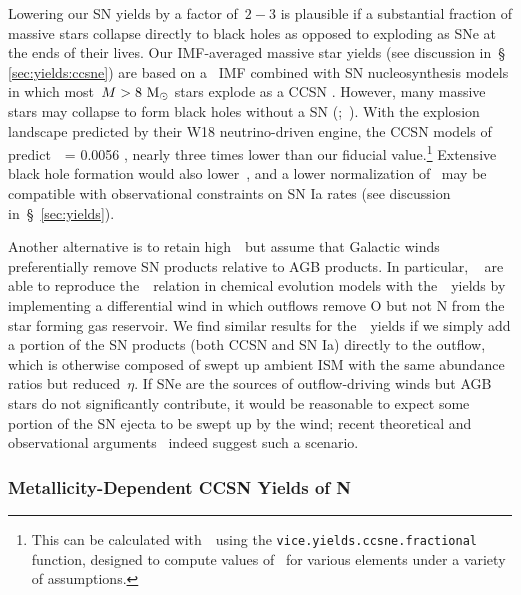 \documentclass[ms.tex]{subfiles}
\begin{document}
\par
Lowering our SN yields by a factor of~$2 - 3$ is plausible if a substantial
fraction of massive stars collapse directly to black holes as opposed to
exploding as SNe at the ends of their lives.
Our IMF-averaged massive star yields (see discussion in~\S
\ref{sec:yields:ccsne}) are based on a~\citet{Kroupa2001} IMF combined with SN
nucleosynthesis models in which most~$M > 8~\text{M}_\odot$ stars explode as a CCSN
\cite[e.g.][]{Woosley1995, Chieffi2004, Chieffi2013, Limongi2018, Nomoto2013}.
However, many massive stars may collapse to form black holes without a SN
(\citealp*{Pejcha2015, Gerke2015};~\citealp{Sukhbold2016, Ertl2016, Adams2017,
Basinger2021, Neustadt2021}).
With the explosion landscape predicted by their W18 neutrino-driven engine, the
CCSN models of~\citet{Sukhbold2016} predict~~= 0.0056
\citep{Griffith2021}, nearly three times lower than our fiducial
value.\footnote{
	This can be calculated with~\vice~using the
	\texttt{vice.yields.ccsne.fractional} function, designed to compute values
	of~ for various elements under a variety of assumptions.
}
Extensive black hole formation would also lower~, and a lower
normalization of~ may be compatible with observational constraints on
SN Ia rates (see discussion in~\S~\ref{sec:yields}).
\par
Another alternative is to retain high~~but assume that Galactic winds
preferentially remove SN products relative to AGB products. In particular,
~\citet{Vincenzo2016a} are able to reproduce the~\ohno~relation
in chemical evolution models with the~\ventura~yields by implementing a
differential wind in which outflows remove O but not N from the star forming
gas reservoir.
We find similar results for the~\ventura~yields if we simply add a portion of
the SN products (both CCSN and SN Ia) directly to the outflow, which is
otherwise composed of swept up ambient ISM with the same abundance ratios but
reduced~$\eta$.
If SNe are the sources of outflow-driving winds but AGB stars do not
significantly contribute, it would be reasonable to expect some portion of
the SN ejecta to be swept up by the wind; recent theoretical
\citep{Christensen2018} and observational arguments~\citep*{Chisholm2018}
indeed suggest such a scenario.

\subsubsection{Metallicity-Dependent CCSN Yields of N}
\label{sec:results:yields:yncc}
\end{document}
